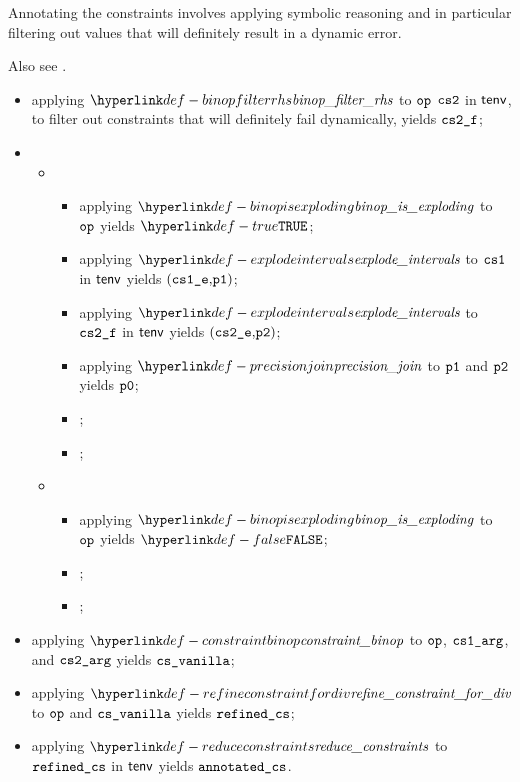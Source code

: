 Annotating the constraints involves applying symbolic reasoning and in particular filtering out values that
will definitely result in a dynamic error.

Also see .

\ProseParagraph
\AllApply
\begin{itemize}
  \item applying $\binopfilterrhs$ to $\texttt{op}$ $\texttt{cs2}$ in $\textsf{tenv}$, to filter out constraints that will definitely fail dynamically, yields $\texttt{cs2\_f}$;
  \item \OneApplies
  \begin{itemize}
    \item {}
    \begin{itemize}
      \item applying $\binopisexploding$ to $\texttt{op}$ yields $\True$;
      \item applying $\explodeintervals$ to $\texttt{cs1}$ in $\textsf{tenv}$ yields $(\texttt{cs1\_e} \mathbf{,} \texttt{p1})$;
      \item applying $\explodeintervals$ to $\texttt{cs2\_f}$ in $\textsf{tenv}$ yields $(\texttt{cs2\_e} \mathbf{,} \texttt{p2})$;
      \item applying $\precisionjoin$ to $\texttt{p1}$ and $\texttt{p2}$ yields $\texttt{p0}$;
      \item {};
      \item {};
    \end{itemize}

    \item {}
    \begin{itemize}
      \item applying $\binopisexploding$ to $\texttt{op}$ yields $\False$;
      \item \Proseeqdef{$\vp$}{$\PrecisionFull$};
      \item \Proseeqdef{$(\csonearg, \cstwoarg)$}{$(\csone, \cstwof)$};
    \end{itemize}
  \end{itemize}
  \item applying $\constraintbinop$ to $\texttt{op}$, $\texttt{cs1\_arg}$, and $\texttt{cs2\_arg}$ yields $\texttt{cs\_vanilla}$;
  \item applying $\refineconstraintfordiv$ to $\texttt{op}$ and $\texttt{cs\_vanilla}$ yields $\texttt{refined\_cs}$\ProseOrTypeError;
  \item applying $\reduceconstraints$ to $\texttt{refined\_cs}$ in $\textsf{tenv}$ yields $\texttt{annotated\_cs}$.
\end{itemize}

